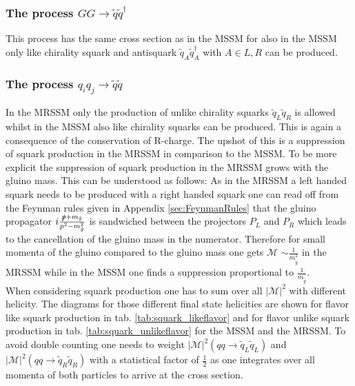 \subsubsection*{The process $GG \to \tilde{q}\tilde{q}^\dagger$}
This process has the same cross section as in the MSSM for also in the MSSM only like chirality squark and antisquark $\tilde{q}_A\tilde{q}_A^\dagger$ with $A \in {L,R}$ can be produced. 

\subsubsection*{The process $q_i q_j \to \tilde{q}\tilde{q}$}
In the MRSSM only the production of unlike chirality squarks $\tilde{q}_L \tilde{q}_R$ is allowed whilst in the MSSM also like chirality squarks can be produced. This is again a consequence of the conservation of R-charge. The upshot of this is a suppression of squark production in the MRSSM in comparison to the MSSM. To be more explicit the suppression of squark production in the MRSSM grows with the gluino mass. This can be understood as follows: As in the MRSSM a left handed squark needs to be produced with a right handed squark one can read off from the Feynman rules given in Appendix \ref{sec:FeynmanRules} that the gluino propagator $i\frac{\slashed{p}+m_{\tilde{g}}}{p^2-m_{\tilde{g}}^2}$ is sandwiched between the projectors $P_L$ and $P_R$ which leads to the cancellation of the gluino mass in the numerator. Therefore for small momenta of the gluino compared to the gluino mass one gets $\mathcal{M}$ $\sim \frac{1}{m_{\tilde{g}}^2}$ in the MRSSM while in the MSSM one finds a suppression proportional to $\frac{1}{m_{\tilde{g}}}$.\\
When considering squark production one has to sum over all $|\mathcal{M}|^2$ with different helicity. The diagrams for those different final state helicities are shown for flavor like squark production in tab. \ref{tab:squark_likeflavor} and for flavor unlike squark production in tab. \ref{tab:squark_unlikeflavor} for the MSSM and the MRSSM. To avoid double counting one needs to weight $|\mathcal{M}|^2(qq\to \tilde{q}_L\tilde{q}_L)$ and $|\mathcal{M}|^2(qq\to \tilde{q}_R\tilde{q}_R)$ with a statistical factor of $\frac{1}{2}$ as one integrates over all momenta of both particles to arrive at the cross section.
